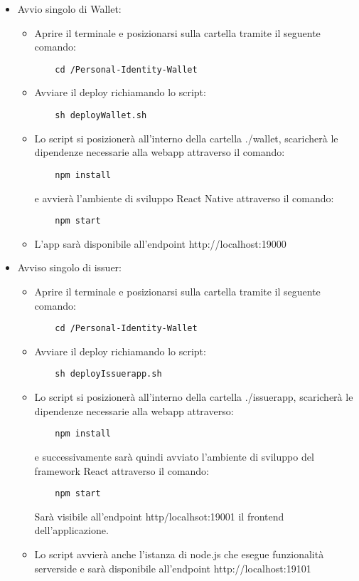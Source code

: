 \begin{itemize}
\item Avvio singolo di Wallet:
\begin{itemize}
\item Aprire il terminale e posizionarsi sulla cartella tramite il seguente comando: 
\begin{verbatim}
    cd /Personal-Identity-Wallet
\end{verbatim}
\item Avviare il deploy richiamando lo script:
\begin{verbatim}
    sh deployWallet.sh
\end{verbatim} 
\item Lo script si posizionerà all'interno della cartella ./wallet, scaricherà le dipendenze necessarie alla webapp attraverso il comando:
\begin{verbatim}
    npm install 
\end{verbatim}
    e avvierà l’ambiente di sviluppo React Native attraverso il comando:
\begin{verbatim}
    npm start
\end{verbatim}
\item L’app sarà disponibile all'endpoint http://localhost:19000
\end{itemize}

\item Avviso singolo di issuer:
\begin{itemize}
\item Aprire il terminale e posizionarsi sulla cartella tramite il seguente comando: 
\begin{verbatim}
    cd /Personal-Identity-Wallet
\end{verbatim}
\item Avviare il deploy richiamando lo script:
\begin{verbatim}
    sh deployIssuerapp.sh
\end{verbatim}
\item Lo script si posizionerà all'interno della cartella ./issuerapp, scaricherà le dipendenze necessarie alla webapp attraverso: 
\begin{verbatim}
    npm install 
\end{verbatim}
    e successivamente sarà quindi avviato l’ambiente di sviluppo del framework React attraverso il comando:
\begin{verbatim}
    npm start 
\end{verbatim}
Sarà visibile all'endpoint http/localhsot:19001 il frontend dell'applicazione.
\item Lo script avvierà anche l’istanza di node.js che esegue funzionalità serverside e sarà disponibile all'endpoint http://localhost:19101
\end{itemize}


\end{itemize}
